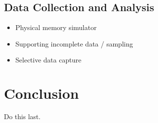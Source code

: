 \documentclass[annual]{acmsiggraph}
\begin{document}
  \subsection{Data Collection and Analysis}
  \begin{itemize}
    \item Physical memory simulator
    \item Supporting incomplete data / sampling
    \item Selective data capture
  \end{itemize}

\section{Conclusion}
  Do this last.



\end{document}
